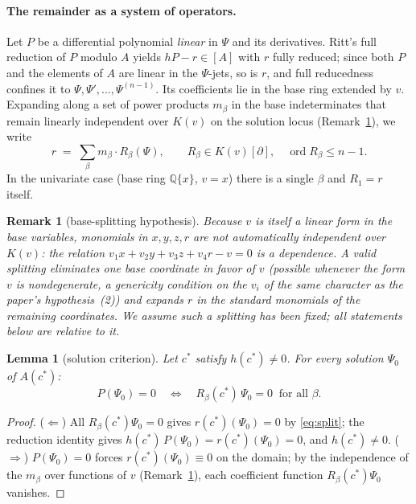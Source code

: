 \documentclass[11pt]{article}
\DeclareMathOperator{\ord}{ord}
\newtheorem{lemma}{Lemma}
\newtheorem{remark}{Remark}
\begin{document}
\paragraph{The remainder as a system of operators.}
Let $P$ be a differential polynomial \emph{linear} in $\Psi$ and its
derivatives. Ritt's full reduction of $P$ modulo $A$ yields
$h P - r \in [A]$ with $r$ fully reduced; since both $P$ and the elements of
$A$ are linear in the $\Psi$-jets, so is $r$, and full reducedness confines
it to $\Psi, \Psi', \dots, \Psi^{(n-1)}$. Its coefficients lie in the base
ring extended by $v$. Expanding along a set of power products
$m_\beta$ in the base indeterminates that remain linearly independent over
$K(v)$ on the solution locus (Remark~\ref{rem:splitting}), we write
\begin{equation}
\label{eq:split}
r \;=\; \sum_\beta m_\beta \cdot R_\beta(\Psi),
\qquad R_\beta \in K(v)[\partial],\quad \ord R_\beta \le n - 1 .
\end{equation}
In the univariate case (base ring $\mathbb{Q}\{x\}$, $v = x$) there is a
single $\beta$ and $R_1 = r$ itself.

\begin{remark}[base-splitting hypothesis]
\label{rem:splitting}
Because $v$ is itself a linear form in the base variables, monomials in
$x, y, z, r$ are \emph{not} automatically independent over $K(v)$: the
relation $v_1 x + v_2 y + v_3 z + v_4 r - v = 0$ is a dependence. A valid
splitting eliminates one base coordinate in favor of $v$ (possible whenever
the form $v$ is nondegenerate, a genericity condition on the $v_i$ of the
same character as the paper's hypothesis~(2)) and expands $r$ in the standard
monomials of the remaining coordinates. We assume such a splitting has been
fixed; all statements below are relative to it.
\end{remark}

\begin{lemma}[solution criterion]
\label{lem:criterion}
Let $c^*$ satisfy $h(c^*) \neq 0$. For every solution $\Psi_0$ of $A(c^*)$:
\[
P(\Psi_0) = 0
\quad\Longleftrightarrow\quad
R_\beta(c^*)\,\Psi_0 = 0 \ \text{ for all } \beta .
\]
\end{lemma}

\begin{proof}
($\Leftarrow$) All $R_\beta(c^*)\Psi_0 = 0$ gives $r(c^*)(\Psi_0) = 0$
by \eqref{eq:split}; the reduction identity gives
$h(c^*)\,P(\Psi_0) = r(c^*)(\Psi_0) = 0$, and $h(c^*) \neq 0$.
($\Rightarrow$) $P(\Psi_0) = 0$ forces $r(c^*)(\Psi_0) \equiv 0$ on the
domain; by the independence of the $m_\beta$ over functions of $v$
(Remark~\ref{rem:splitting}), each coefficient function
$R_\beta(c^*)\Psi_0$ vanishes.
\end{proof}
\end{document}
